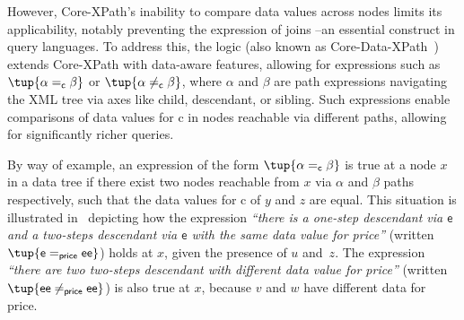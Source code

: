 \documentclass[10pt,a4paper]{amsart}
\theoremstyle{definition}
\theoremstyle{remark}
\begin{document}
However, Core-XPath’s inability to compare data values across nodes limits its applicability, notably preventing the expression of joins --an essential construct in query languages. To address this, the logic \xpathd (also known as Core-Data-XPath~\cite{BojanczykMSS09}) extends Core-XPath with data-aware features, allowing for expressions such as $\tup{\alpha =_{\textsf{c}} \beta}$ or $\tup{\alpha \neq_{\textsf{c}} \beta}$, where $\alpha$ and $\beta$ are path expressions navigating the XML tree via axes like child, descendant, or sibling. Such expressions enable comparisons of data values for \textsf{c} in nodes reachable via different paths, allowing for significantly richer queries.

By way of example, an expression of the form $\tup{\alpha =_{\textsf{c}} \beta}$ is true at a node $x$ in a data tree if there exist two nodes reachable from $x$ via $\alpha$ and $\beta$ paths respectively, such that the data values for \textsf{c} of $y$ and $z$ are equal. This situation is illustrated in~ depicting how the expression {\em ``there is
a one-step descendant via $\textsf{e}$ and a two-steps descendant via $\textsf{e}$ with the same data
value for \textsf{price}''} (written $\tup{\textsf{e} =_{\textsf{price}} \textsf{e}\textsf{e}}$) holds at $x$, given the presence of $u$ and~$z$. The
expression {\em ``there are two two-steps descendant with different data value for \textsf{price}''} (written $\tup{\textsf{e}\textsf{e} \neq_{\textsf{price}} \textsf{e}\textsf{e}}$)
is also true at $x$, because $v$ and $w$ have different data for \textsf{price}.


%
\end{document}
